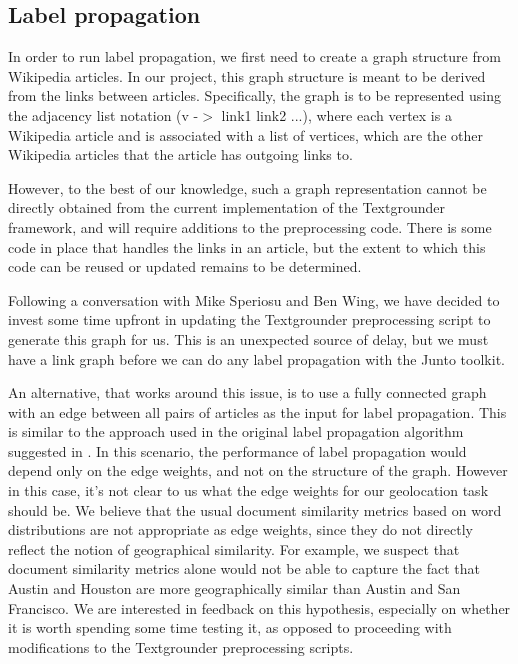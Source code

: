 \subsection{Label propagation} 

In order to run label propagation, we first need to create a graph structure
from Wikipedia articles. In our project, this graph structure is meant to be
derived from the links between articles. Specifically, the graph is to be
represented using the adjacency list notation (v -$>$ link1 link2 ...), where
each vertex is a Wikipedia article and is associated with a list of vertices,
which are the other Wikipedia articles that the article has outgoing links to.

\par However, to the best of our knowledge, such a graph
representation cannot be directly obtained from the current implementation of
the Textgrounder framework, and will require additions to the preprocessing
code. There is some code in place that handles the links in an article, but the
extent to which this code can be reused or updated remains to be determined.



\par Following a conversation with Mike Speriosu and Ben Wing, we have decided
to invest some time upfront in updating the Textgrounder preprocessing script
to generate this graph for us. This is an unexpected source of delay, but we
must have a link graph before we can do any label propagation with the Junto
toolkit.

\par An alternative, that works around this issue, is to use a fully connected
graph with an edge between all pairs of articles as the input for label
propagation. This is similar to the approach used in the original label
propagation algorithm suggested in . In this scenario,
the performance of label propagation would depend only on the edge weights,
and not on the structure of the graph. However in this case, it's not clear to
us what the edge weights for our geolocation task should be. We believe that
the usual document similarity metrics based on word distributions are not
appropriate as edge weights, since they do not directly reflect the notion of
geographical similarity. For example, we suspect that document similarity
metrics alone would not be able to capture the fact that Austin and Houston
are more geographically similar than Austin and San Francisco. We are
interested in feedback on this hypothesis, especially on whether it is worth
spending some time testing it, as opposed to proceeding with modifications to
the Textgrounder preprocessing scripts.
